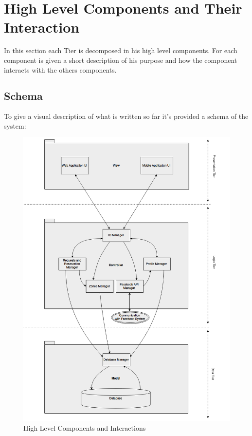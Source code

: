 \documentclass[../../../../dd.tex]{subfiles}
\begin{document}
	\section{High Level Components and Their Interaction}
		In this section each Tier is decomposed in his high level components. For each component is given a short description of his purpose and how the component interacts with the others components.
	
		

		

		

		\subsection{Schema}
			To give a visual description of what is written so far it's provided a schema of the system:

			\begin{figure}[H]
				\centering
				\includegraphics[width=\textwidth, scale=0.5]{../images/HighLevelComponents}
			\caption{High Level Components and Interactions}\label{fig:HighLevelComponents}
		\end{figure}
	
\end{document}
